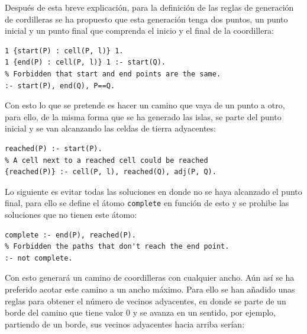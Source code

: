 Después de esta breve explicación, para la definición de las reglas de generación de cordilleras se ha propuesto que esta generación tenga dos puntos, un punto inicial y un punto final que comprenda el inicio y el final de la coordillera: \\

\begin{lstlisting}[label=lst:pointsystem]
% Generate the start and the end position
1 {start(P) : cell(P, l)} 1.
1 {end(P) : cell(P, l)} 1 :- start(Q).
% Forbidden that start and end points are the same.
:- start(P), end(Q), P==Q.
\end{lstlisting}

\hspace{1em}

Con esto lo que se pretende es hacer un camino que vaya de un punto a otro, para ello, de la misma forma que se ha generado las islas, se parte del punto inicial y se van alcanzando las celdas de tierra adyacentes: \\

\begin{lstlisting}[label=lst:mreached]
% The start cell is reached always.
reached(P) :- start(P).
% A cell next to a reached cell could be reached
{reached(P)} :- cell(P, l), reached(Q), adj(P, Q).
\end{lstlisting}

\hspace{1em}

Lo siguiente es evitar todas las soluciones en donde no se haya alcanzado el punto final, para ello se define el átomo \texttt{complete} en función de esto y se prohibe las soluciones que no tienen este átomo: \\

\begin{lstlisting}[label=lst:mend]
% The path is complete if the end is reached.
complete :- end(P), reached(P).
% Forbidden the paths that don't reach the end point.
:- not complete.
\end{lstlisting}

\hspace{1em}

Con esto generará un camino de coordilleras con cualquier ancho. Aún así se ha preferido acotar este camino a un ancho máximo. Para ello se han añadido unas reglas para obtener el número de vecinos adyacentes, en donde se parte de un borde del camino que tiene valor 0 y se avanza en un sentido, por ejemplo, partiendo de un borde, sus vecinos adyacentes hacia arriba serían: \\

